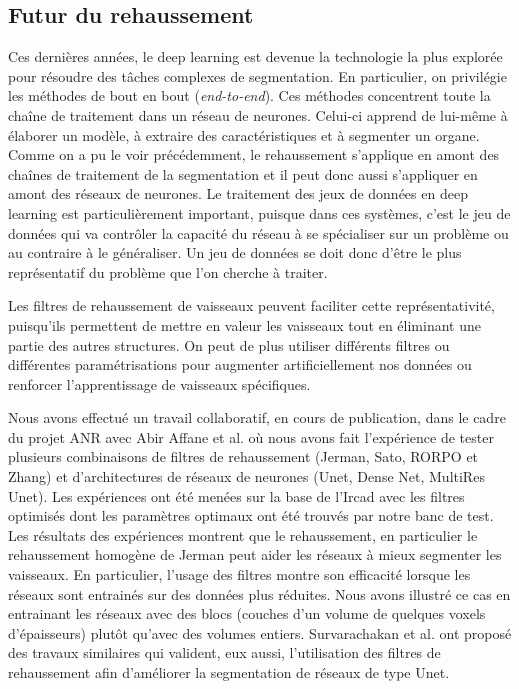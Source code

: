 \subsection{Futur du rehaussement}
Ces dernières années, le deep learning est devenue la technologie la plus explorée pour résoudre des tâches complexes de segmentation. En particulier,  on privilégie les méthodes de bout en bout (\textit{end-to-end}). Ces méthodes concentrent toute la chaîne de traitement dans un réseau de neurones. Celui-ci apprend de lui-même à élaborer un modèle, à extraire des caractéristiques et à segmenter un organe. Comme on a pu le voir précédemment, le rehaussement s'applique en amont des chaînes de traitement de la segmentation et il peut donc aussi s'appliquer en amont des réseaux de neurones. Le traitement des jeux de données en deep learning est particulièrement important, puisque dans ces systèmes, c'est le jeu de données qui va contrôler la capacité du réseau à se spécialiser sur un problème ou au contraire à le généraliser. Un jeu de données se doit donc d'être le plus représentatif du problème que l'on cherche à traiter.

Les filtres de rehaussement de vaisseaux peuvent faciliter cette représentativité, puisqu'ils permettent de mettre en valeur les vaisseaux tout en éliminant une partie des autres structures. On peut de plus utiliser différents filtres ou différentes paramétrisations pour augmenter artificiellement nos données ou renforcer l'apprentissage de vaisseaux spécifiques.

Nous avons effectué un travail collaboratif, en cours de publication, dans le cadre du projet ANR avec Abir Affane et al. où nous avons fait l'expérience de tester plusieurs combinaisons de filtres de rehaussement (Jerman, Sato, RORPO et Zhang) et d'architectures de réseaux de neurones (Unet, Dense Net, MultiRes Unet). Les expériences ont été menées sur la base de l'Ircad avec les filtres optimisés dont les paramètres optimaux ont été trouvés par notre banc de test. Les résultats des expériences montrent que le rehaussement, en particulier le rehaussement homogène de Jerman peut aider les réseaux à mieux segmenter les vaisseaux. En particulier, l'usage des filtres montre son efficacité lorsque les réseaux sont entrainés sur des données plus réduites. Nous avons illustré ce cas en entrainant les réseaux avec des blocs (couches d'un volume de quelques voxels d'épaisseurs) plutôt qu'avec des volumes entiers. Survarachakan et al. \cite{Survarachakan2021_deep_vesselness} ont proposé des travaux similaires qui valident, eux aussi, l'utilisation des filtres de rehaussement afin d'améliorer la segmentation de réseaux de type Unet.


